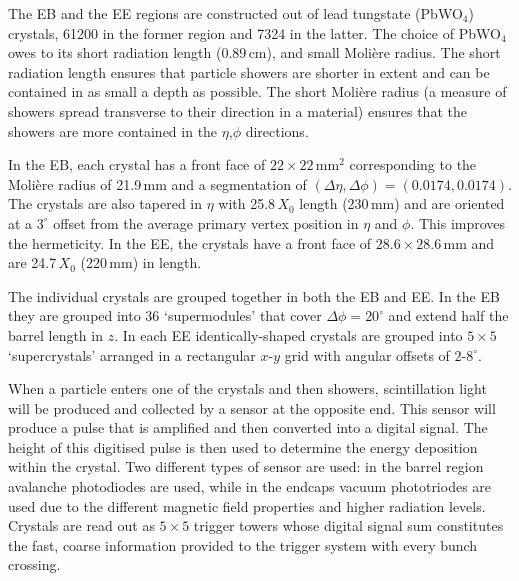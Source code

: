The EB and the EE regions are constructed out of lead tungstate (PbWO$_{4}$) crystals, 61200 in the former region and 7324 in the latter. The choice of PbWO$_{4}$ owes to its short radiation length (0.89\,cm), and small Moli\`{e}re radius. The short radiation length ensures that particle showers are shorter in extent and can be contained in as small a depth as possible. The short Moli\`{e}re radius (a measure of showers spread transverse to their direction in a material) ensures that the showers are more contained in the $\eta$,$\phi$ directions. 

In the EB, each crystal has a front face of $22\times{}22$\,mm$^{2}$ corresponding to the Moli\`{e}re radius of 21.9\,mm and a segmentation of $(\Delta\eta,\Delta\phi) = (0.0174,0.0174)$. 
The crystals are also tapered in $\eta$ with 25.8\,$X_{0}$ length (230\,mm) and are oriented at a $3^{\circ}$ offset from the average primary vertex position in $\eta$ and $\phi$. This improves the hermeticity.
In the EE, the crystals have a front face of $28.6\times{}28.6$\,mm and are 24.7\,$X_{0}$ (220\,mm) in length. 

The individual crystals are grouped together in both the EB and EE. In the EB they are grouped into 36 `supermodules' that cover $\Delta\phi = 20^{\circ}$ and extend half the barrel length in $z$.
In each EE identically-shaped crystals are grouped into $5\times5$ `supercrystals' arranged in a rectangular $x$-$y$ grid with angular offsets of $2$-$8^{\circ}$.

When a particle enters one of the crystals and then showers, scintillation light will be produced and collected by a sensor at the opposite end. This sensor will produce a pulse that is amplified and then converted into a digital signal. The height of this digitised pulse is then used to determine the energy deposition within the crystal. 
Two different types of sensor are used: in the barrel region avalanche photodiodes are used, while in the endcaps vacuum phototriodes are used due to the different magnetic field properties and higher radiation levels.
Crystals are read out as $5\times{5}$ trigger towers whose digital signal sum constitutes the fast, coarse information provided to the trigger system with every bunch crossing.



